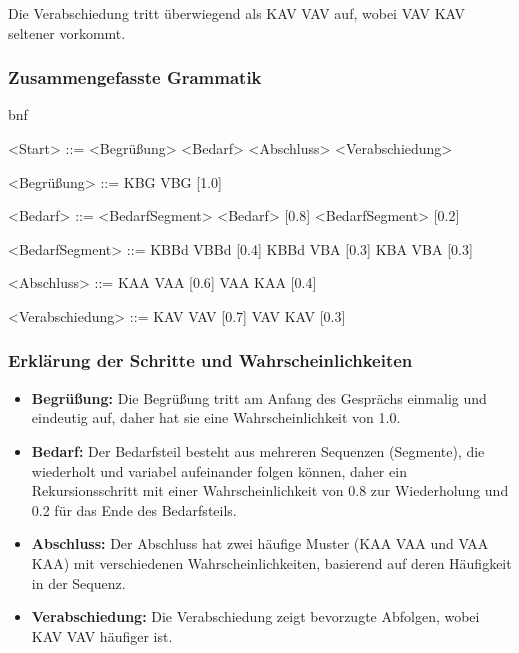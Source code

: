 \documentclass[
]{article}
\begin{document}
Die Verabschiedung tritt überwiegend als KAV VAV auf, wobei VAV KAV
seltener vorkommt.

\subsubsection{\texorpdfstring{\textbf{Zusammengefasste
Grammatik}}{Zusammengefasste Grammatik}}\label{zusammengefasste-grammatik}

bnf

\textless Start\textgreater{} ::= \textless Begrüßung\textgreater{}
\textless Bedarf\textgreater{} \textless Abschluss\textgreater{}
\textless Verabschiedung\textgreater{}

\textless Begrüßung\textgreater{} ::= KBG VBG {[}1.0{]}

\textless Bedarf\textgreater{} ::= \textless BedarfSegment\textgreater{}
\textless Bedarf\textgreater{} {[}0.8{]} \textbar{}
\textless BedarfSegment\textgreater{} {[}0.2{]}

\textless BedarfSegment\textgreater{} ::= KBBd VBBd {[}0.4{]} \textbar{}
KBBd VBA {[}0.3{]} \textbar{} KBA VBA {[}0.3{]}

\textless Abschluss\textgreater{} ::= KAA VAA {[}0.6{]} \textbar{} VAA
KAA {[}0.4{]}

\textless Verabschiedung\textgreater{} ::= KAV VAV {[}0.7{]} \textbar{}
VAV KAV {[}0.3{]}

\subsubsection{\texorpdfstring{\textbf{Erklärung der Schritte und
Wahrscheinlichkeiten}}{Erklärung der Schritte und Wahrscheinlichkeiten}}\label{erkluxe4rung-der-schritte-und-wahrscheinlichkeiten}

\begin{itemize}
\item
  \textbf{Begrüßung:} Die Begrüßung tritt am Anfang des Gesprächs
  einmalig und eindeutig auf, daher hat sie eine Wahrscheinlichkeit von
  1.0.
\item
  \textbf{Bedarf:} Der Bedarfsteil besteht aus mehreren Sequenzen
  (Segmente), die wiederholt und variabel aufeinander folgen können,
  daher ein Rekursionsschritt mit einer Wahrscheinlichkeit von 0.8 zur
  Wiederholung und 0.2 für das Ende des Bedarfsteils.
\item
  \textbf{Abschluss:} Der Abschluss hat zwei häufige Muster (KAA VAA und
  VAA KAA) mit verschiedenen Wahrscheinlichkeiten, basierend auf deren
  Häufigkeit in der Sequenz.
\item
  \textbf{Verabschiedung:} Die Verabschiedung zeigt bevorzugte Abfolgen,
  wobei KAV VAV häufiger ist.
\end{itemize}
\end{document}
